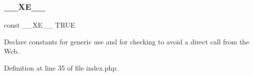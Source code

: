 \hypertarget{index_8php_a697de427d83b791899ae45d555377756}{}\label{index_8php_a697de427d83b791899ae45d555377756} 
\subsubsection{\texorpdfstring{\+\_\+\+\_\+\+X\+E\+\_\+\+\_\+}{\_\_XE\_\_}}
{\footnotesize\ttfamily const \+\_\+\+\_\+\+X\+E\+\_\+\+\_\+ T\+R\+UE}



Declare constants for generic use and for checking to avoid a direct call from the Web. 



Definition at line 35 of file index.\+php.

